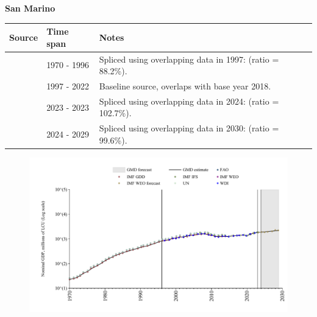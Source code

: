 \documentclass[12pt,a4paper,landscape]{article}
\begin{document}
\begin{adjustbox}{max totalsize={\paperwidth}{\paperheight},center}
\begin{minipage}[t][\textheight][t]{\textwidth}
\vspace*{0.5cm}
{}
\begin{center}
{\Large\bfseries San Marino}
\end{center}
\vspace{0.5cm}
\begin{table}[H]
\centering
\small
\begin{tabular}{|l|l|l|}
\hline
\textbf{Source} & \textbf{Time span} & \textbf{Notes} \\
\hline
\rowcolor{white}\cite{UN}& 1970 - 1996 &Spliced using overlapping data in 1997: (ratio = 88.2\%).\\
\rowcolor{lightgray}\cite{WDI}& 1997 - 2022 &Baseline source, overlaps with base year 2018.\\
\rowcolor{white}\cite{FAO}& 2023 - 2023 &Spliced using overlapping data in 2024: (ratio = 102.7\%).\\
\rowcolor{lightgray}\cite{IMF_WEO_forecast}& 2024 - 2029 &Spliced using overlapping data in 2030: (ratio = 99.6\%).\\
\hline
\end{tabular}
\end{table}
\begin{figure}[H]
\centering
\includegraphics[width=\textwidth,height=0.6\textheight,keepaspectratio]{graphs/SMR_nGDP.pdf}
\end{figure}
\end{minipage}
\end{adjustbox}
\end{document}
